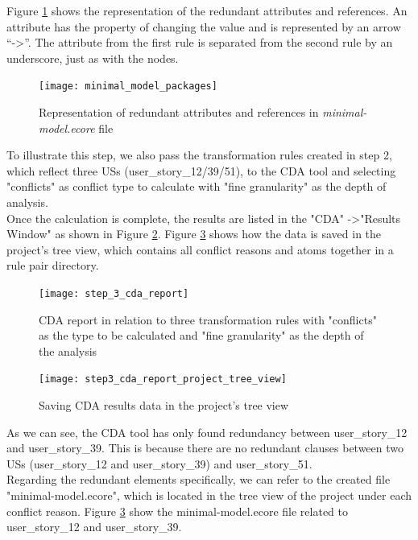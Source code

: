 Figure \ref{fig:minimal_model_packages} shows the representation of the redundant attributes and references. An attribute has the property of changing the value and is represented by an arrow \enquote{-\textgreater}. The attribute from the first rule is separated from the second rule by an underscore, just as with the nodes.
\begin{figure}[h]
	\centering
	\texttt{[image: minimal\_model\_packages]}
	\caption{Representation of redundant attributes and references in \textit{minimal-model.ecore} file}\label{fig:minimal_model_packages}
\end{figure}
\begin{example}
	To illustrate this step, we also pass the transformation rules created in step 2, which reflect three USs (user\_story\_12/39/51), to the CDA tool and selecting "conflicts" as conflict type to calculate with "fine granularity" as the depth of analysis.\\
	Once the calculation is complete, the results are listed in the "CDA" -\textgreater "Results Window" as shown in Figure \ref{fig:step_3_cda_report}. Figure \ref{fig:step3_cda_report_project_tree_view} shows how the data is saved in the project's tree view, which contains all conflict reasons and atoms together in a rule pair directory.
	\begin{figure}[h]
		\centering
		\texttt{[image: step\_3\_cda\_report]}
		\caption{CDA report in relation to three transformation rules with "conflicts" as the type to be calculated and "fine granularity" as the depth of the analysis}\label{fig:step_3_cda_report}
	\end{figure}
	\begin{figure}[h]
		\centering
		\texttt{[image: step3\_cda\_report\_project\_tree\_view]}
		\caption{Saving CDA results data in the project's tree view}\label{fig:step3_cda_report_project_tree_view}
	\end{figure}
	As we can see, the CDA tool has only found redundancy between user\_story\_12 and user\_story\_39. This is because there are no redundant clauses between two USs (user\_story\_12 and user\_story\_39) and user\_story\_51.\\
	Regarding the redundant elements specifically, we can refer to the created file "minimal-model.ecore", which is located in the tree view of the project under each conflict reason. Figure \ref{fig:step3_cda_report_project_tree_view} show the minimal-model.ecore file related to user\_story\_12 and user\_story\_39.\\\\

\end{example}

